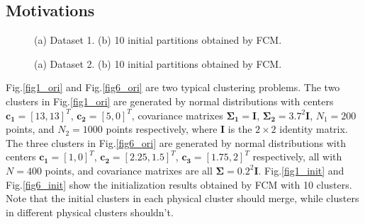 \documentclass[journal,transmag]{IEEEtran}
\begin{document}
\subsection{Motivations}
\label{sec-2-2}
\begin{figure}[!t]
   \centering
\caption{(a) Dataset 1. (b) 10 initial partitions obtained by FCM.}
\label{fig1}
\end{figure}
\begin{figure}[!t]
   \centering
\caption{(a) Dataset 2. (b) 10 initial partitions obtained by FCM.}
\label{fig6}
\end{figure}
Fig.\ref{fig1_ori} and Fig.\ref{fig6_ori} are two typical clustering problems. The two clusters in Fig.\ref{fig1_ori} are generated by normal distributions with centers $\mathbf{c_1}=[13, 13]^T$, $\mathbf{c_2}=[5, 0]^T$, covariance matrixes $\mathbf{\Sigma_1}=\mathbf{I}$, $\mathbf{\Sigma_2}=3.7^2\mathbf{I}$, $N_1=200$ points, and $N_2=1000$ points  respectively, where $\mathbf{I}$ is the $2\times 2$ identity matrix. The three clusters in Fig.\ref{fig6_ori} are generated by normal distributions with  centers $\mathbf{c_1}=[1, 0]^T$, $\mathbf{c_2}=[2.25, 1.5]^T$, $\mathbf{c_3}=[1.75, 2]^T$ respectively, all with $N=400$ points, and covariance matrixes are all $\mathbf{\Sigma}=0.2^2\mathbf{I}$. Fig.\ref{fig1_init} and Fig.\ref{fig6_init} show the initialization results obtained by FCM with 10 clusters. Note that the initial clusters in each physical cluster should merge, while clusters in different physical clusters shouldn't.
\end{document}
